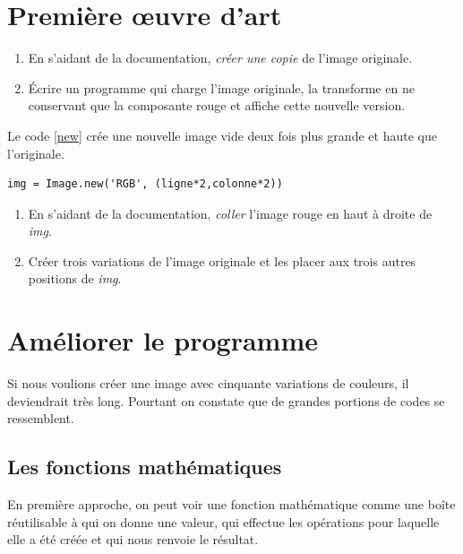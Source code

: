 \documentclass[a4paper,11pt]{article}
\begin{document}
\begin{Form}
\section{Première œuvre d'art}
\begin{activite}
\begin{enumerate}
\item En s'aidant de la documentation, \emph{créer une copie} de l'image originale.
\item Écrire un programme qui charge l'image originale, la transforme en ne conservant que la composante rouge et affiche cette nouvelle version.
\end{enumerate}
Le code \ref{new} crée une nouvelle image vide deux fois plus grande et haute que l'originale.
\begin{center}
\begin{lstlisting}
img = Image.new('RGB', (ligne*2,colonne*2))
\end{lstlisting}
\label{new}
\end{center}
\begin{enumerate}[resume]
\item En s'aidant de la documentation, \emph{coller} l'image rouge en haut à droite de \emph{img}.
\item Créer trois variations de l'image originale et les placer aux trois autres positions de \emph{img}. 
\end{enumerate}
\end{activite}
\section{Améliorer le programme}
\begin{commentprof}
Si nous voulions créer une image avec cinquante variations de couleurs, il deviendrait très long. Pourtant on constate que de grandes portions de codes se ressemblent. 
\end{commentprof}
\subsection{Les fonctions mathématiques}
En première approche, on peut voir une fonction mathématique comme une boîte réutilisable à qui on donne une valeur, qui effectue les opérations pour laquelle elle a été créée et qui nous renvoie le résultat.
\begin{figure}[!h]
\centering
{}
\end{figure}
\end{Form}
\end{document}
